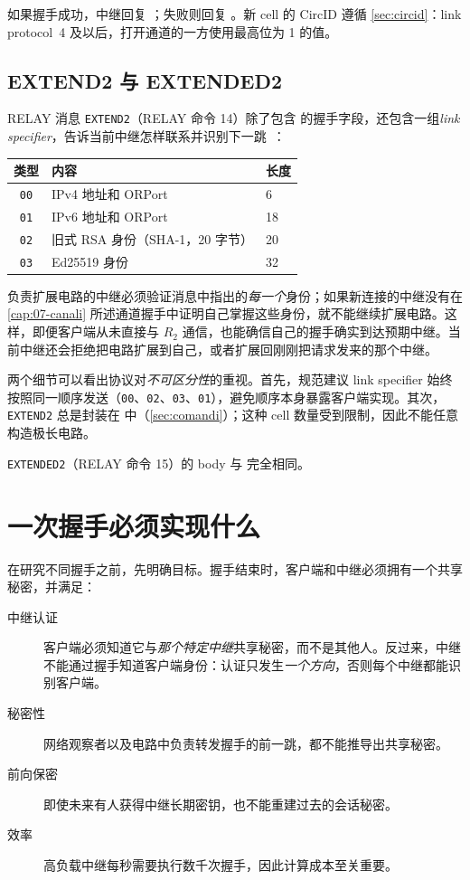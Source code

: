 如果握手成功，中继回复 ；失败则回复 。新 cell 的 CircID 遵循 \cref{sec:circid}：link protocol~4 及以后，打开通道的一方使用最高位为 1 的值。

\subsection{EXTEND2 与 EXTENDED2}\label{sec:extend2}

RELAY 消息 \texttt{EXTEND2}（RELAY 命令 14）除了包含  的握手字段，还包含一组\emph{link specifier}，告诉当前中继怎样联系并识别下一跳~：

\begin{center}
\begin{tabular}{cll}
\toprule
类型 & 内容 & 长度 \\
\midrule
\texttt{00} & IPv4 地址和 ORPort & 6 \\
\texttt{01} & IPv6 地址和 ORPort & 18 \\
\texttt{02} & 旧式 RSA 身份（SHA-1，20 字节） & 20 \\
\texttt{03} & Ed25519 身份 & 32 \\
\bottomrule
\end{tabular}
\end{center}

负责扩展电路的中继必须验证消息中指出的\emph{每一个}身份；如果新连接的中继没有在 \cref{cap:07-canali} 所述通道握手中证明自己掌握这些身份，就不能继续扩展电路。这样，即便客户端从未直接与 $R_2$ 通信，也能确信自己的握手确实到达预期中继。当前中继还会拒绝把电路扩展到自己，或者扩展回刚刚把请求发来的那个中继。

两个细节可以看出协议对\emph{不可区分性}的重视。首先，规范建议 link specifier 始终按照同一顺序发送（\texttt{00}、\texttt{02}、\texttt{03}、\texttt{01}），避免顺序本身暴露客户端实现。其次，\texttt{EXTEND2} 总是封装在  中（\cref{sec:comandi}）；这种 cell 数量受到限制，因此不能任意构造极长电路。

\texttt{EXTENDED2}（RELAY 命令 15）的 body 与  完全相同。

\section{一次握手必须实现什么}\label{sec:circ-requisiti}

在研究不同握手之前，先明确目标。握手结束时，客户端和中继必须拥有一个共享秘密，并满足：
\begin{description}
  \item[中继认证] 客户端必须知道它与\emph{那个特定中继}共享秘密，而不是其他人。反过来，中继不能通过握手知道客户端身份：认证只发生\emph{一个方向}，否则每个中继都能识别客户端。
  \item[秘密性] 网络观察者以及电路中负责转发握手的前一跳，都不能推导出共享秘密。
  \item[前向保密] 即使未来有人获得中继长期密钥，也不能重建过去的会话秘密。
  \item[效率] 高负载中继每秒需要执行数千次握手，因此计算成本至关重要。
\end{description}

